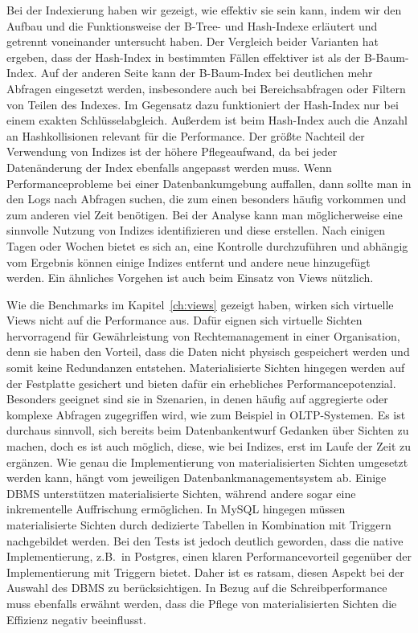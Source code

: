 Bei der Indexierung haben wir gezeigt, wie effektiv sie sein kann, indem wir den Aufbau und die Funktionsweise der B-Tree- und Hash-Indexe erläutert und getrennt voneinander untersucht haben.
Der Vergleich beider Varianten hat ergeben, dass der Hash-Index in bestimmten Fällen effektiver ist als der B-Baum-Index.
Auf der anderen Seite kann der B-Baum-Index bei deutlichen mehr Abfragen eingesetzt werden, insbesondere auch bei Bereichsabfragen oder Filtern von Teilen des Indexes.
Im Gegensatz dazu funktioniert der Hash-Index nur bei einem exakten Schlüsselabgleich.
Außerdem ist beim Hash-Index auch die Anzahl an Hashkollisionen relevant für die Performance.
Der größte Nachteil der Verwendung von Indizes ist der höhere Pflegeaufwand, da bei jeder Datenänderung der Index ebenfalls angepasst werden muss.
Wenn Performanceprobleme bei einer Datenbankumgebung auffallen, dann sollte man in den Logs nach Abfragen suchen, die zum einen besonders häufig vorkommen und zum anderen viel Zeit benötigen.
Bei der Analyse kann man möglicherweise eine sinnvolle Nutzung von Indizes identifizieren und diese erstellen.
Nach einigen Tagen oder Wochen bietet es sich an, eine Kontrolle durchzuführen und abhängig vom Ergebnis können einige Indizes entfernt und andere neue hinzugefügt werden.
Ein ähnliches Vorgehen ist auch beim Einsatz von Views nützlich.

Wie die Benchmarks im Kapitel~\ref{ch:views} gezeigt haben, wirken sich virtuelle Views nicht auf die Performance aus.
Dafür eignen sich virtuelle Sichten hervorragend für Gewährleistung von Rechtemanagement in einer Organisation, denn sie haben den Vorteil, dass die Daten nicht physisch gespeichert werden und somit keine Redundanzen entstehen.
Materialisierte Sichten hingegen werden auf der Festplatte gesichert und bieten dafür ein erhebliches Performancepotenzial.
Besonders geeignet sind sie in Szenarien, in denen häufig auf aggregierte oder komplexe Abfragen zugegriffen wird, wie zum Beispiel in OLTP-Systemen.
Es ist durchaus sinnvoll, sich bereits beim Datenbankentwurf Gedanken über Sichten zu machen, doch es ist auch möglich, diese, wie bei Indizes, erst im Laufe der Zeit zu ergänzen.
Wie genau die Implementierung von materialisierten Sichten umgesetzt werden kann, hängt vom jeweiligen Datenbankmanagementsystem ab.
Einige DBMS unterstützen materialisierte Sichten, während andere sogar eine inkrementelle Auffrischung ermöglichen.
In MySQL hingegen müssen materialisierte Sichten durch dedizierte Tabellen in Kombination mit Triggern nachgebildet werden.
Bei den Tests ist jedoch deutlich geworden, dass die native Implementierung, z.B.\ in Postgres, einen klaren Performancevorteil gegenüber der Implementierung mit Triggern bietet.
Daher ist es ratsam, diesen Aspekt bei der Auswahl des DBMS zu berücksichtigen.
In Bezug auf die Schreibperformance muss ebenfalls erwähnt werden, dass die Pflege von materialisierten Sichten die Effizienz negativ beeinflusst.


